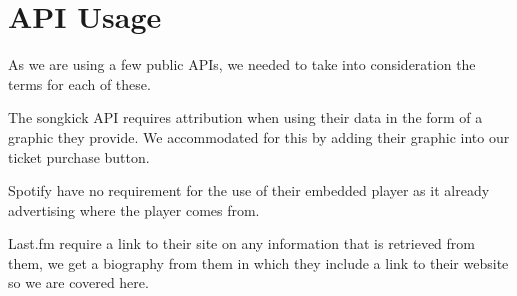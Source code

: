 \documentclass[10pt]{article}
\begin{document}
    \section{API Usage}
        As we are using a few public APIs, we needed to take into consideration the terms for each of these.

        The songkick API requires attribution when using their data in the form of a graphic they provide. We accommodated for this by adding their graphic into our ticket purchase button.

        Spotify have no requirement for the use of their embedded player as it already advertising where the player comes from.

        Last.fm require a link to their site on any information that is retrieved from them, we get a biography from them in which they include a link to their website so we are covered here.
\end{document}
